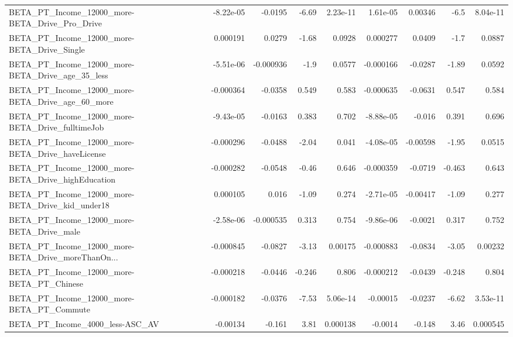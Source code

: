 \begin{tabular}{lrrrrrrrr}
BETA\_PT\_Income\_12000\_more-BETA\_Drive\_Pro\_Drive     &   -8.22e-05 &      -0.0195 &     -6.69 & 2.23e-11 &   1.61e-05 &     0.00346 &         -6.5 &      8.04e-11 \\
BETA\_PT\_Income\_12000\_more-BETA\_Drive\_Single        &    0.000191 &       0.0279 &     -1.68 &   0.0928 &   0.000277 &      0.0409 &         -1.7 &        0.0887 \\
BETA\_PT\_Income\_12000\_more-BETA\_Drive\_age\_35\_less   &   -5.51e-06 &    -0.000936 &      -1.9 &   0.0577 &  -0.000166 &     -0.0287 &        -1.89 &        0.0592 \\
BETA\_PT\_Income\_12000\_more-BETA\_Drive\_age\_60\_more   &   -0.000364 &      -0.0358 &     0.549 &    0.583 &  -0.000635 &     -0.0631 &        0.547 &         0.584 \\
BETA\_PT\_Income\_12000\_more-BETA\_Drive\_fulltimeJob   &   -9.43e-05 &      -0.0163 &     0.383 &    0.702 &  -8.88e-05 &      -0.016 &        0.391 &         0.696 \\
BETA\_PT\_Income\_12000\_more-BETA\_Drive\_haveLicense   &   -0.000296 &      -0.0488 &     -2.04 &    0.041 &  -4.08e-05 &    -0.00598 &        -1.95 &        0.0515 \\
BETA\_PT\_Income\_12000\_more-BETA\_Drive\_highEducation &   -0.000282 &      -0.0548 &     -0.46 &    0.646 &  -0.000359 &     -0.0719 &       -0.463 &         0.643 \\
BETA\_PT\_Income\_12000\_more-BETA\_Drive\_kid\_under18   &    0.000105 &        0.016 &     -1.09 &    0.274 &  -2.71e-05 &    -0.00417 &        -1.09 &         0.277 \\
BETA\_PT\_Income\_12000\_more-BETA\_Drive\_male          &   -2.58e-06 &    -0.000535 &     0.313 &    0.754 &  -9.86e-06 &     -0.0021 &        0.317 &         0.752 \\
BETA\_PT\_Income\_12000\_more-BETA\_Drive\_moreThanOn... &   -0.000845 &      -0.0827 &     -3.13 &  0.00175 &  -0.000883 &     -0.0834 &        -3.05 &       0.00232 \\
BETA\_PT\_Income\_12000\_more-BETA\_PT\_Chinese          &   -0.000218 &      -0.0446 &    -0.246 &    0.806 &  -0.000212 &     -0.0439 &       -0.248 &         0.804 \\
BETA\_PT\_Income\_12000\_more-BETA\_PT\_Commute          &   -0.000182 &      -0.0376 &     -7.53 & 5.06e-14 &   -0.00015 &     -0.0237 &        -6.62 &      3.53e-11 \\
BETA\_PT\_Income\_4000\_less-ASC\_AV                    &    -0.00134 &       -0.161 &      3.81 & 0.000138 &    -0.0014 &      -0.148 &         3.46 &      0.000545 \\

\end{tabular}
